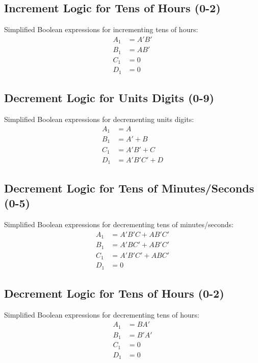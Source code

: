 \subsection{Increment Logic for Tens of Hours (0-2)}


Simplified Boolean expressions for incrementing tens of hours:
\begin{align}
    A_1 &= A'B' \\
    B_1 &= AB' \\
    C_1 &= 0 \\
    D_1 &= 0
\end{align}

\subsection{Decrement Logic for Units Digits (0-9)}


Simplified Boolean expressions for decrementing units digits:
\begin{align}
    A_1 &= A \\
    B_1 &= A' + B \\
    C_1 &= A'B' + C \\
    D_1 &= A'B'C' + D
\end{align}

\subsection{Decrement Logic for Tens of Minutes/Seconds (0-5)}


Simplified Boolean expressions for decrementing tens of minutes/seconds:
\begin{align}
    A_1 &= A'B'C + AB'C' \\
    B_1 &= A'BC' + AB'C' \\
    C_1 &= A'B'C' + ABC' \\
    D_1 &= 0
\end{align}

\subsection{Decrement Logic for Tens of Hours (0-2)}


Simplified Boolean expressions for decrementing tens of hours:
\begin{align}
    A_1 &= BA' \\
    B_1 &= B'A' \\
    C_1 &= 0 \\
    D_1 &= 0
\end{align}
